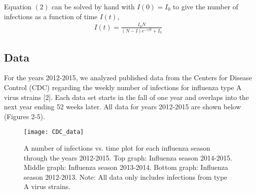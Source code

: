 \documentclass[11pt, oneside]{article}   	%
\begin{document}
\noindent Equation $(2)$ can be solved by hand with $I(0) = I_0$ to give the number of infections as a function of time $I(t)$,
\begin{align}
I(t) = \frac{I_0N}{(N-I)e^{-r \beta t} + I_0}
\end{align}


\subsection{Data}
For the years 2012-2015, we analyzed published data from the Centers for Disease Control (CDC) regarding the weekly number of infections for influenza type A virus strains [2]. Each data set starts in the fall of one year and overlaps into the next year ending 52 weeks later. All data for years 2012-2015 are shown below (Figures 2-5).  

\begin{figure}[H]
\begin{center}
	\texttt{[image: CDC\_data]}
	\caption{A number of infections vs. time plot for each influenza season through the years 2012-2015.
			Top graph: Influenza season 2014-2015.
			Middle graph: Influenza season 2013-2014.
			Bottom graph: Influenza season 2012-2013.
			Note: All data only includes infections from type A virus strains. }
	\label{2014-2015 weekly CDC data.}
\end{center}
\end{figure}


\end{document}
